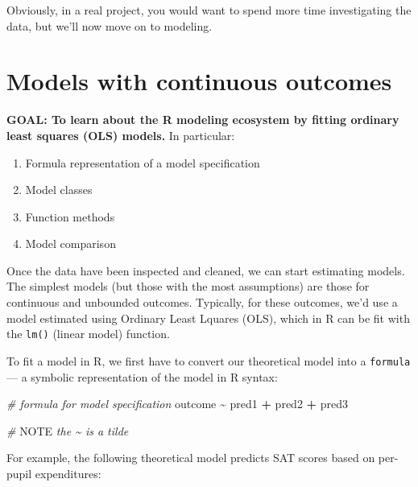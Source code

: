 \documentclass[
]{book}
\newenvironment{Shaded}{\begin{snugshade}}{\end{snugshade}}
\newcommand{\AlertTok}[1]{\textcolor[rgb]{0.94,0.16,0.16}{#1}}
\newcommand{\CommentTok}[1]{\textcolor[rgb]{0.56,0.35,0.01}{\textit{#1}}}
\newcommand{\NormalTok}[1]{#1}
\newcommand{\OperatorTok}[1]{\textcolor[rgb]{0.81,0.36,0.00}{\textbf{#1}}}
\newcommand{\StringTok}[1]{\textcolor[rgb]{0.31,0.60,0.02}{#1}}
\providecommand{\tightlist}{%
  \setlength{\itemsep}{0pt}\setlength{\parskip}{0pt}}
\begin{document}
Obviously, in a real project, you would want to spend more time investigating the data,
but we'll now move on to modeling.

\hypertarget{models-with-continuous-outcomes}{%
\section{Models with continuous outcomes}\label{models-with-continuous-outcomes}}

\begin{alert}

\textbf{GOAL: To learn about the R modeling ecosystem by fitting ordinary least squares (OLS) models.} In particular:

\begin{enumerate}
\def\labelenumi{\arabic{enumi}.}
\tightlist
\item
  Formula representation of a model specification
\item
  Model classes
\item
  Function methods
\item
  Model comparison
\end{enumerate}

\end{alert}

Once the data have been inspected and cleaned, we can start estimating models.
The simplest models (but those with the most assumptions) are those for continuous and unbounded outcomes.
Typically, for these outcomes, we'd use a model estimated using Ordinary Least Lquares (OLS),
which in R can be fit with the \texttt{lm()} (linear model) function.

To fit a model in R, we first have to convert our theoretical model into
a \texttt{formula} --- a symbolic representation of the model in R syntax:

\begin{Shaded}
\begin{Highlighting}[]
\CommentTok{\# formula for model specification}
\NormalTok{outcome }\OperatorTok{\textasciitilde{}}\StringTok{ }\NormalTok{pred1 }\OperatorTok{+}\StringTok{ }\NormalTok{pred2 }\OperatorTok{+}\StringTok{ }\NormalTok{pred3}

\CommentTok{\# }\AlertTok{NOTE}\CommentTok{ the \textasciitilde{} is a tilde}
\end{Highlighting}
\end{Shaded}

For example, the following theoretical model predicts SAT scores based on per-pupil expenditures:
\end{document}
